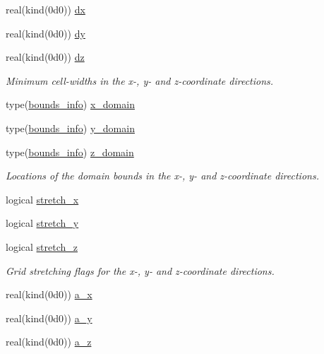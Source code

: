 \begin{DoxyCompactItemize}
real(kind(0d0)) \hyperlink{namespacem__global__parameters_aaa9a08d5b90f48e0f6bb64c209fd89e4}{dx}
\item 
real(kind(0d0)) \hyperlink{namespacem__global__parameters_a5ff5660b10330ad917331259642e8dc4}{dy}
\item 
real(kind(0d0)) \hyperlink{namespacem__global__parameters_ab930758827576d5cf2518679bf670351}{dz}
\begin{DoxyCompactList}\small\item\em Minimum cell-\/widths in the x-\/, y-\/ and z-\/coordinate directions. \end{DoxyCompactList}\item 
type(\hyperlink{structm__derived__types_1_1bounds__info}{bounds\+\_\+info}) \hyperlink{namespacem__global__parameters_a58e390acc41a75facd63f1d89a8e60bc}{x\+\_\+domain}
\item 
type(\hyperlink{structm__derived__types_1_1bounds__info}{bounds\+\_\+info}) \hyperlink{namespacem__global__parameters_a94bfe5cc861c66dadab450d25a6b5817}{y\+\_\+domain}
\item 
type(\hyperlink{structm__derived__types_1_1bounds__info}{bounds\+\_\+info}) \hyperlink{namespacem__global__parameters_a4b6341f4ce0cc9c395b4791549357efc}{z\+\_\+domain}
\begin{DoxyCompactList}\small\item\em Locations of the domain bounds in the x-\/, y-\/ and z-\/coordinate directions. \end{DoxyCompactList}\item 
logical \hyperlink{namespacem__global__parameters_a95a3647227ae84b17613caee22408853}{stretch\+\_\+x}
\item 
logical \hyperlink{namespacem__global__parameters_acd02bb9d62d1e2a5a3185e12b0bdaea9}{stretch\+\_\+y}
\item 
logical \hyperlink{namespacem__global__parameters_aaeee716bda208dc0427196cdb8ad8cdf}{stretch\+\_\+z}
\begin{DoxyCompactList}\small\item\em Grid stretching flags for the x-\/, y-\/ and z-\/coordinate directions. \end{DoxyCompactList}\item 
real(kind(0d0)) \hyperlink{namespacem__global__parameters_aa0b506b1bb27c795ff1ca2049cd84b95}{a\+\_\+x}
\item 
real(kind(0d0)) \hyperlink{namespacem__global__parameters_a143fcefbf2bf4d1b296851d664c49b3a}{a\+\_\+y}
\item 
real(kind(0d0)) \hyperlink{namespacem__global__parameters_a8e0a3ebd94eeb22f50b48dff8a7e0cce}{a\+\_\+z}

\end{DoxyCompactItemize}
